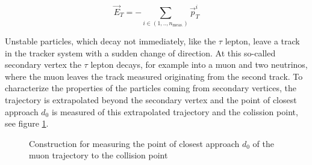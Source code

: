 \begin{equation}
	\label{eq:eq_2_6}
	\vec{E}_{T} = - \sum_{i \in (1, .., n_{\text{meas.}})} \vec{p}_{T}^{i} 
\end{equation}

Unstable particles, which decay not immediately, like the $\tau$ lepton, leave a track in the tracker system with a sudden change of direction. At this so-called secondary vertex the $\tau$ lepton decays, for example into a muon and two neutrinos, where the muon leaves the track measured originating from the second track. To characterize the properties of the particles coming from secondary vertices, the trajectory is extrapolated beyond the secondary vertex and the point of closest approach $d_{0}$ is measured of this extrapolated trajectory and the colission point, see figure \ref{fig:fig_2_11}.

\begin{figure}[ht]
	\centering
	\caption[Construction of point of closest approach]{Construction for measuring the point of closest approach $d_{0}$ of the muon trajectory to the collision point}
	\label{fig:fig_2_11}
\end{figure}


